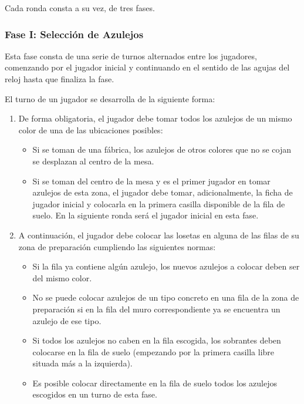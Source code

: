 \documentclass[11pt]{article}
\begin{document}
Cada ronda consta a su vez, de tres fases.

\subsubsection{Fase I: Selección de Azulejos}

Esta fase consta de una serie de turnos alternados entre los jugadores, comenzando por el jugador inicial y continuando en el sentido de las agujas del reloj hasta que finaliza la fase.

El turno de un jugador se desarrolla de la siguiente forma:

\begin{enumerate}
	\item De forma obligatoria, el jugador debe tomar todos los azulejos de un mismo color de una de las ubicaciones posibles:
	\begin{itemize}
		\item Si se toman de una fábrica, los azulejos de otros colores que no se cojan se desplazan al centro de la mesa.
		\item Si se toman del centro de la mesa y es el primer jugador en tomar azulejos de esta zona, el jugador debe tomar, adicionalmente, la ficha de jugador inicial y colocarla en la primera casilla disponible de la fila de suelo. En la siguiente ronda será el jugador inicial en esta fase.
	\end{itemize}
	\item A continuación, el jugador debe colocar las losetas en alguna de las filas de su zona de preparación cumpliendo las siguientes normas:
	\begin{itemize}
		\item Si la fila ya contiene algún azulejo, los nuevos azulejos a colocar deben ser del mismo color.
		\item No se puede colocar azulejos de un tipo concreto en una fila de la zona de preparación si en la fila del muro correspondiente ya se encuentra un azulejo de ese tipo.
		\item Si todos los azulejos no caben en la fila escogida, los sobrantes deben colocarse en la fila de suelo (empezando por la primera casilla libre situada más a la izquierda).
		\item Es posible colocar directamente en la fila de suelo todos los azulejos escogidos en un turno de esta fase.
	\end{itemize}
\end{enumerate}
\end{document}
